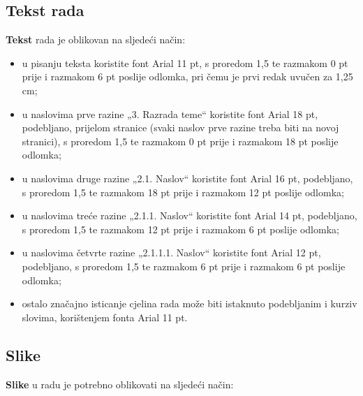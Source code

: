 \documentclass[]{foi}
\begin{document}
\subsection{Tekst rada}

\textbf{Tekst} rada je oblikovan na sljedeći način:
\begin{itemize}
    \item u pisanju teksta koristite font Arial 11 pt, s proredom 1,5 te razmakom 0 pt prije i razmakom 6 pt poslije odlomka, pri čemu je prvi redak uvučen za 1,25 cm;

    \item u naslovima prve razine „3. Razrada teme“ koristite font Arial 18 pt, podebljano, prijelom stranice (svaki naslov prve razine treba biti na novoj stranici), s proredom 1,5 te razmakom 0 pt prije i razmakom 18 pt poslije odlomka;

    \item u naslovima druge razine „2.1. Naslov“ koristite font Arial 16 pt, podebljano, s proredom 1,5 te razmakom 18 pt prije i razmakom 12 pt poslije odlomka;

    \item u naslovima treće razine „2.1.1. Naslov“ koristite font Arial 14 pt, podebljano, s proredom 1,5 te razmakom 12 pt prije i razmakom 6 pt poslije odlomka;

    \item u naslovima četvrte razine „2.1.1.1. Naslov“ koristite font Arial 12 pt, podebljano, s proredom 1,5 te razmakom 6 pt prije i razmakom 6 pt poslije odlomka;

    \item ostalo značajno isticanje cjelina rada može biti istaknuto podebljanim i kurziv slovima, korištenjem fonta Arial 11 pt.
\end{itemize}

\subsection{Slike}

\textbf{Slike} u radu je potrebno oblikovati na sljedeći način:
\end{document}
